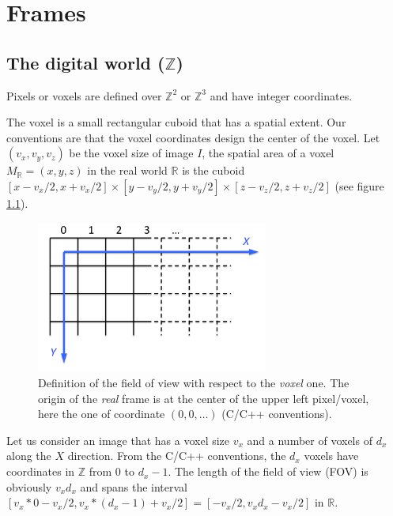 






\chapter{Frames}
\label{sec:frames}

\section{The digital world ($\mathbb{Z}$)}

Pixels or voxels are defined over $\mathbb{Z}^2$ or $\mathbb{Z}^3$ and have integer coordinates. 


The voxel is a small rectangular cuboid that has a spatial extent. Our conventions are that the voxel coordinates design the center of the voxel. Let $(v_x, v_y, v_z)$ be the voxel size of image $I$, the spatial area of a voxel $M_{\mathbb{R}} = (x,y,z)$ in the real world $\mathbb{R}$ is the cuboid
$[x-v_x/2, x+v_x/2] \times [y-v_y/2, y+v_y/2] \times [z-v_z/2, z+v_z/2]$ (see figure \ref{fig:frame}). 


\begin{figure}[ht]
\begin{center}
 \includegraphics[height=5cm]{figures/fig-frame.png}
\end{center}
\caption{\label{fig:frame}Definition of the  field of view with respect to the  \textit{voxel} one. The origin of the \textit{real} frame is at the center of the upper left pixel/voxel, here the one of coordinate $(0,0,\ldots)$ (C/C++ conventions).}
\end{figure}

Let us consider an image that has a voxel size $v_x$ and a number of voxels of $d_x$ along the $X$ direction. From the C/C++ conventions, the $d_x$ voxels have coordinates in $\mathbb{Z}$ from $0$ to $d_x-1$. The length of the field of view (FOV) is obviously $v_x d_x$ and spans the interval $[v_x * 0 -v_x/2 , v_x*(d_x-1)+v_x/2]
= [-v_x/2, v_x d_x - v_x/2]$ in $\mathbb{R}$.

